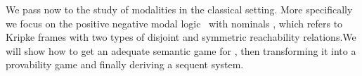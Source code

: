 
We pass now to the study of modalities in the classical setting. More specifically we  focus on the positive negative modal logic \PNL\ with nominals
\cite{DBLP:journals/jolli/XiongA20,DBLP:journals/logcom/PedersenSA21}, which refers to Kripke frames with two
types of disjoint and symmetric reachability relations.We will show how to get an adequate semantic
game  for \PNL, then transforming it into a provability
game and finally deriving a sequent system.
